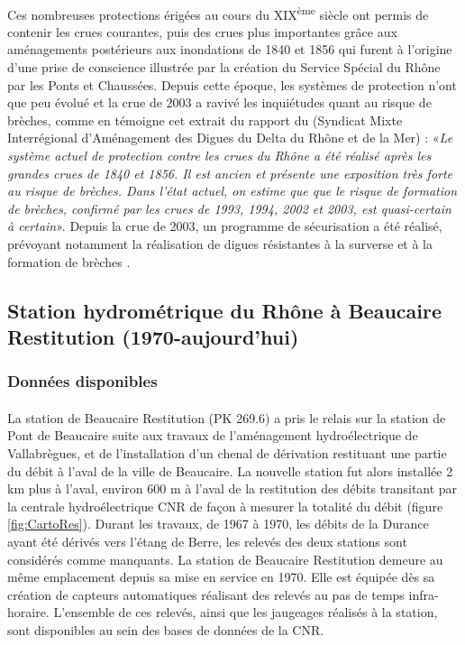 	\paragraph{} Ces nombreuses protections érigées au cours du XIX\textsuperscript{ème} siècle ont permis de contenir les crues courantes, puis des crues plus importantes grâce aux aménagements postérieurs aux inondations de 1840 et 1856 qui furent à l'origine d'une prise de conscience illustrée par la création du Service Spécial du Rhône par les Ponts et Chaussées. Depuis cette époque, les systèmes de protection n'ont que peu évolué et la crue de 2003 a ravivé les inquiétudes quant au risque de brèches, comme en témoigne cet extrait du rapport du \citet{symadrem_programme_2012} (Syndicat Mixte Interrégional d'Aménagement des Digues du Delta du Rhône et de la Mer) : «\textit{Le système actuel de protection contre les crues du Rhône a été réalisé après les grandes crues de 1840 et 1856. Il est ancien et présente une exposition très forte au risque de brèches. Dans l'état actuel, on estime que que le risque de formation de brèches, confirmé par les crues de 1993, 1994, 2002 et 2003, est quasi-certain à certain}». Depuis la crue de 2003, un programme de sécurisation a été réalisé, prévoyant notamment la réalisation de digues résistantes à la surverse et à la formation de brèches \citep{symadrem_programme_2012}.    
		

\FloatBarrier
	\subsection{Station hydrométrique du Rhône à Beaucaire Restitution (1970-aujourd'hui)}
	\label{subsec:Restit}
	\subsubsection{Données disponibles}

	\paragraph{} La station de Beaucaire Restitution (PK 269.6) a pris le relais sur la station de Pont de Beaucaire suite aux travaux de l'aménagement hydroélectrique de Vallabrègues, et de l'installation d'un chenal de dérivation restituant une partie du débit à l'aval de la ville de Beaucaire. La nouvelle station fut alors installée 2 km plus à l'aval, environ 600 m à l'aval de la restitution des débits transitant par la centrale hydroélectrique CNR de façon à mesurer la totalité du débit (figure \ref{fig:CartoRes}). Durant les travaux, de 1967 à 1970, les débits de la Durance ayant été dérivés vers l'étang de Berre, les relevés des deux stations sont considérés comme manquants. La station de Beaucaire Restitution demeure au même emplacement depuis sa mise en service en 1970. Elle est équipée dès sa création de capteurs automatiques réalisant des relevés au pas de temps infra-horaire. L'ensemble de ces relevés, ainsi que les jaugeages réalisés à la station, sont disponibles au sein des bases de données de la CNR.
		
